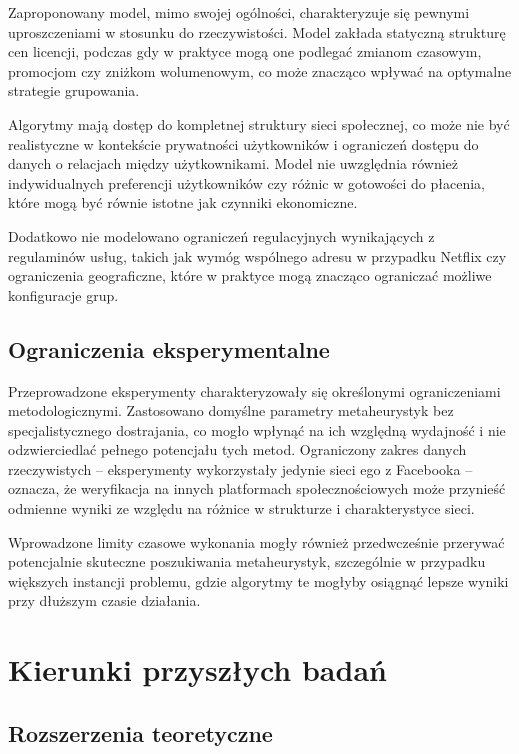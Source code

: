 Zaproponowany model, mimo swojej ogólności, charakteryzuje się pewnymi uproszczeniami w stosunku do rzeczywistości. Model zakłada statyczną strukturę cen licencji, podczas gdy w praktyce mogą one podlegać zmianom czasowym, promocjom czy zniżkom wolumenowym, co może znacząco wpływać na optymalne strategie grupowania.

Algorytmy mają dostęp do kompletnej struktury sieci społecznej, co może nie być realistyczne w kontekście prywatności użytkowników i ograniczeń dostępu do danych o relacjach między użytkownikami. Model nie uwzględnia również indywidualnych preferencji użytkowników czy różnic w gotowości do płacenia, które mogą być równie istotne jak czynniki ekonomiczne.

Dodatkowo nie modelowano ograniczeń regulacyjnych wynikających z regulaminów usług, takich jak wymóg wspólnego adresu w przypadku Netflix czy ograniczenia geograficzne, które w praktyce mogą znacząco ograniczać możliwe konfiguracje grup.

\subsection{Ograniczenia eksperymentalne}

Przeprowadzone eksperymenty charakteryzowały się określonymi ograniczeniami metodologicznymi. Zastosowano domyślne parametry metaheurystyk bez specjalistycznego dostrajania, co mogło wpłynąć na ich względną wydajność i nie odzwierciedlać pełnego potencjału tych metod. Ograniczony zakres danych rzeczywistych -- eksperymenty wykorzystały jedynie sieci ego z Facebooka -- oznacza, że weryfikacja na innych platformach społecznościowych może przynieść odmienne wyniki ze względu na różnice w strukturze i charakterystyce sieci.

Wprowadzone limity czasowe wykonania mogły również przedwcześnie przerywać potencjalnie skuteczne poszukiwania metaheurystyk, szczególnie w przypadku większych instancji problemu, gdzie algorytmy te mogłyby osiągnąć lepsze wyniki przy dłuższym czasie działania.

\section{Kierunki przyszłych badań}

\subsection{Rozszerzenia teoretyczne}

